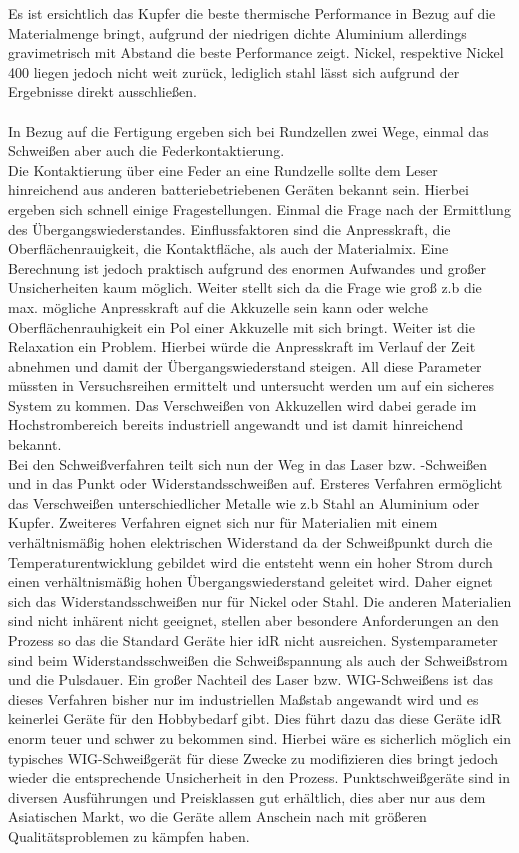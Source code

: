 Es ist ersichtlich das Kupfer die beste thermische Performance in Bezug auf die Materialmenge bringt, aufgrund der niedrigen dichte Aluminium allerdings gravimetrisch mit Abstand die beste Performance zeigt. Nickel, respektive Nickel 400 liegen jedoch nicht weit zurück, lediglich stahl lässt sich aufgrund der Ergebnisse direkt ausschließen.\\
\\
In Bezug auf die Fertigung ergeben sich bei Rundzellen zwei Wege, einmal das Schweißen aber auch die Federkontaktierung.\\
Die Kontaktierung über eine Feder an eine Rundzelle sollte dem Leser hinreichend aus anderen batteriebetriebenen Geräten bekannt sein. Hierbei ergeben sich schnell einige Fragestellungen. Einmal die Frage nach der Ermittlung des Übergangswiederstandes. Einflussfaktoren sind die Anpresskraft, die Oberflächenrauigkeit, die Kontaktfläche, als auch der Materialmix. Eine Berechnung ist jedoch praktisch aufgrund des enormen Aufwandes und großer Unsicherheiten kaum möglich. Weiter stellt sich da die Frage wie groß z.b die max. mögliche Anpresskraft auf die Akkuzelle sein kann oder welche Oberflächenrauhigkeit ein Pol einer Akkuzelle mit sich bringt. Weiter ist die Relaxation ein Problem. Hierbei würde die Anpresskraft im Verlauf der Zeit abnehmen und damit der Übergangswiederstand steigen. All diese Parameter müssten in Versuchsreihen ermittelt und untersucht werden um auf ein sicheres System zu kommen. Das Verschweißen von Akkuzellen wird dabei gerade im Hochstrombereich bereits industriell angewandt und ist damit hinreichend bekannt.\\
Bei den Schweißverfahren teilt sich nun der Weg in das Laser bzw. -Schweißen und in das Punkt oder Widerstandsschweißen auf. Ersteres Verfahren ermöglicht das Verschweißen unterschiedlicher Metalle wie z.b Stahl an Aluminium oder Kupfer. Zweiteres Verfahren eignet sich nur für Materialien mit einem verhältnismäßig hohen elektrischen Widerstand da der Schweißpunkt durch die Temperaturentwicklung gebildet wird die entsteht wenn ein hoher Strom durch einen verhältnismäßig hohen Übergangswiederstand geleitet wird. Daher eignet sich das Widerstandsschweißen nur für Nickel oder Stahl. Die anderen Materialien sind nicht inhärent nicht geeignet, stellen aber besondere Anforderungen an den Prozess so das die Standard Geräte hier \ac{idR} nicht ausreichen. Systemparameter sind beim Widerstandsschweißen die Schweißspannung als auch der Schweißstrom und die Pulsdauer. Ein großer Nachteil des Laser bzw. \ac{WIG}-Schweißens ist das dieses Verfahren bisher nur im industriellen Maßstab angewandt wird und es keinerlei Geräte für den Hobbybedarf gibt. Dies führt dazu das diese Geräte \ac{idR} enorm teuer und schwer zu bekommen sind. Hierbei wäre es sicherlich möglich ein typisches \ac{WIG}-Schweißgerät für diese Zwecke zu modifizieren dies bringt jedoch wieder die entsprechende Unsicherheit in den Prozess. Punktschweißgeräte sind in diversen Ausführungen und Preisklassen gut erhältlich, dies aber nur aus dem Asiatischen Markt, wo die Geräte allem Anschein nach mit größeren Qualitätsproblemen zu kämpfen haben.
	
